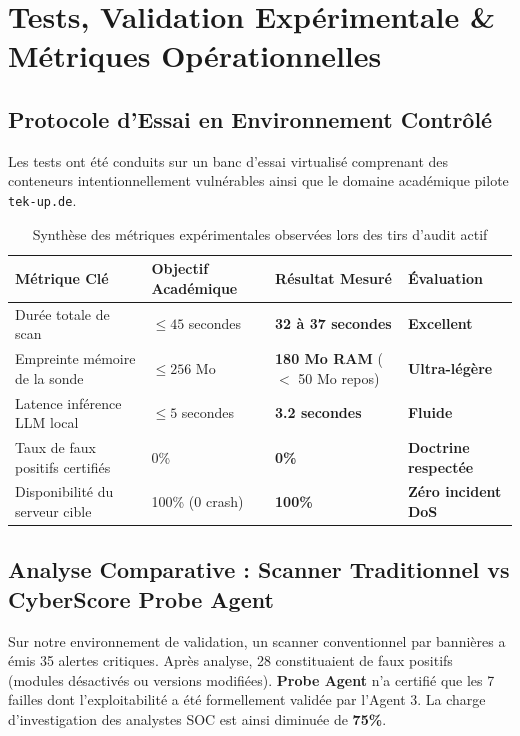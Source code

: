 \documentclass[11pt,a4paper,oneside]{article}
\begin{document}
\section{Tests, Validation Expérimentale \& Métriques Opérationnelles}

\subsection{Protocole d'Essai en Environnement Contrôlé}
Les tests ont été conduits sur un banc d'essai virtualisé comprenant des conteneurs intentionnellement vulnérables ainsi que le domaine académique pilote \texttt{tek-up.de}.

\begin{table}[htbp]
\centering
\small
\renewcommand{\arraystretch}{1.1}
\begin{tabularx}{\textwidth}{lXXl}
\toprule
\textbf{Métrique Clé} & \textbf{Objectif Académique} & \textbf{Résultat Mesuré} & \textbf{Évaluation} \\
\midrule
Durée totale de scan & $\le 45$ secondes & \textbf{32 à 37 secondes} & \textbf{Excellent} \\
Empreinte mémoire de la sonde & $\le 256$ Mo & \textbf{180 Mo RAM} ($<$ 50 Mo repos) & \textbf{Ultra-légère} \\
Latence inférence LLM local & $\le 5$ secondes & \textbf{3.2 secondes} & \textbf{Fluide} \\
Taux de faux positifs certifiés & 0\% & \textbf{0\%} & \textbf{Doctrine respectée} \\
Disponibilité du serveur cible & 100\% (0 crash) & \textbf{100\%} & \textbf{Zéro incident DoS} \\
\bottomrule
\end{tabularx}
\caption{Synthèse des métriques expérimentales observées lors des tirs d'audit actif}
\end{table}

\subsection{Analyse Comparative : Scanner Traditionnel vs CyberScore Probe Agent}
Sur notre environnement de validation, un scanner conventionnel par bannières a émis 35 alertes critiques. Après analyse, 28 constituaient de faux positifs (modules désactivés ou versions modifiées). \textbf{Probe Agent} n'a certifié que les 7 failles dont l'exploitabilité a été formellement validée par l'Agent 3. La charge d'investigation des analystes SOC est ainsi diminuée de \textbf{75\%}.
\end{document}
